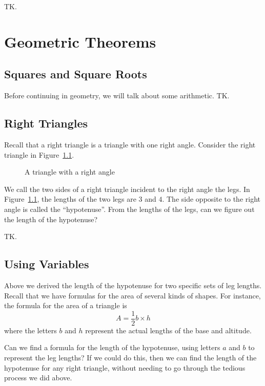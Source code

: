 \documentclass[a4paper,10pt]{report}
\begin{document}
TK.

\chapter{Geometric Theorems}

\section{Squares and Square Roots}

Before continuing in geometry, we will talk about some arithmetic. TK.

\section{Right Triangles}

Recall that a \gls{right triangle} is a triangle with one right angle. Consider
the right triangle in Figure~\ref{gt:triangle-345}.

\begin{figure}

  \caption{A triangle with a right angle}
  \label{gt:triangle-345}
\end{figure}

We call the two sides of a right triangle incident to the right angle the legs.
In Figure~\ref{gt:triangle-345}, the lengths of the two legs are \(3\) and
\(4\). The side opposite to the right angle is called the ``hypotenuse''. From
the lengths of the legs, can we figure out the length of the hypotenuse?

TK.

\section{Using Variables}

Above we derived the length of the hypotenuse for two specific sets of leg
lengths. Recall that we have formulas for the area of several kinds of shapes.
For instance, the formula for the area of a triangle is \[
  A = \frac{1}{2} b \times h
\] where the letters \(b\) and \(h\) represent the actual lengths of the base
and altitude.

Can we find a formula for the length of the hypotenuse, using letters \(a\) and
\(b\) to represent the leg lengths? If we could do this, then we can find the
length of the hypotenuse for any right triangle, without needing to go through
the tedious process we did above.
\end{document}
